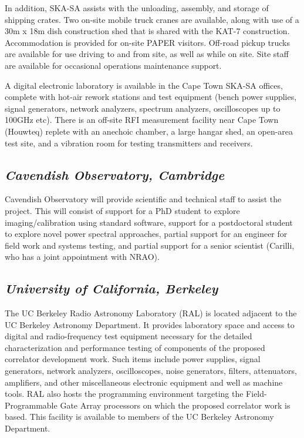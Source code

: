 \documentclass[11pt]{article}
\begin{document}
In addition, SKA-SA assists with the unloading, assembly, and storage of
shipping crates. Two on-site mobile truck cranes are available, along with use
of a 30m x 18m dish construction shed that is shared with the KAT-7 construction.
Accommodation is provided for on-site PAPER visitors. Off-road pickup trucks
are available for use driving to and from site, as well as while on site.  Site staff are available for
occasional operations maintenance support.

A digital electronic laboratory is available in the Cape Town SKA-SA offices,
complete with hot-air rework stations and test equipment (bench
power supplies, signal generators, network analyzers, spectrum analyzers,
oscilloscopes up to 100GHz etc). There is an off-site RFI measurement facility
near Cape Town (Houwteq) replete with 
an anechoic
chamber, a large hangar shed, an open-area test site, and a vibration room for testing
transmitters and receivers.

\subsection*{\it Cavendish Observatory, Cambridge}

Cavendish Observatory will provide scientific and technical staff to assist the project.  This will consist of
support for a PhD student to explore imaging/calibration using standard software,
support for a postdoctoral student 
to explore novel power spectral approaches,
partial support for an engineer for field work and systems testing,
and partial support for a senior scientist (Carilli, who has a joint appointment with NRAO).

\subsection*{\it University of California, Berkeley}

The UC Berkeley Radio Astronomy Laboratory (RAL) is located adjacent to the UC
Berkeley Astronomy Department. It provides laboratory space and access to
digital and radio-frequency test equipment necessary for the detailed
characterization and performance testing of components of the proposed correlator
development work. Such items include power supplies, signal generators, network
analyzers, oscilloscopes, noise generators, filters, attenuators, amplifiers,
and other miscellaneous electronic equipment and well as machine tools. RAL also hosts the programming
environment targeting the Field-Programmable Gate Array processors on which the
proposed correlator work is based. This facility is available to members of the
UC Berkeley Astronomy Department.
\end{document}
